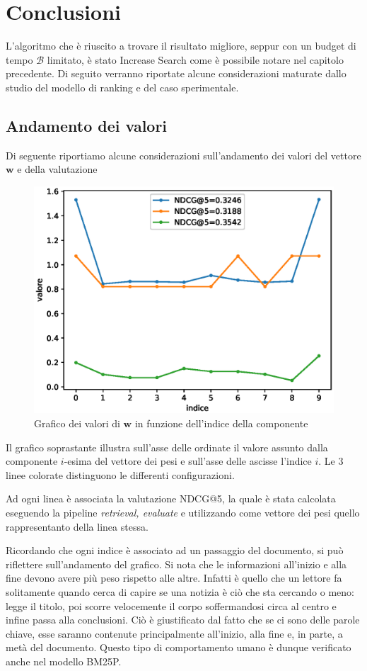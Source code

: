 \chapter{Conclusioni}
L'algoritmo che è riuscito a trovare il risultato migliore, seppur con un budget di tempo $\mathcal{B}$ limitato,
è stato Increase Search come è possibile notare nel capitolo precedente.
Di seguito verranno riportate alcune considerazioni maturate
dallo studio del modello di ranking e del caso sperimentale.

\section{Andamento dei valori}
Di seguente riportiamo alcune considerazioni sull'andamento dei valori
del vettore $\boldsymbol{w}$ e della valutazione


\begin{figure}[h!]
	\centering
	\includegraphics[width=0.7\linewidth]{figure/w_vectors}
	\caption[Distribuzione dei valori di $\boldsymbol{w}$]{Grafico dei valori di $\boldsymbol{w}$ in funzione dell'indice della componente}
	\label{fig:wvectors}
\end{figure}

Il grafico soprastante illustra sull'asse delle ordinate il valore assunto
dalla componente $i$-esima del vettore dei pesi e sull'asse delle ascisse
l'indice $i$. Le 3 linee colorate distinguono le differenti configurazioni.

Ad ogni linea è associata la valutazione NDCG@5, la quale è stata calcolata
eseguendo la pipeline \textit{retrieval, evaluate} e utilizzando come vettore
dei pesi quello rappresentanto della linea stessa.

Ricordando che ogni indice è associato ad un passaggio del documento,
si può riflettere sull'andamento del grafico.
Si nota che le informazioni all'inizio e alla fine
devono avere più peso rispetto alle altre. Infatti è quello che un lettore
fa solitamente quando cerca di capire se una notizia è ciò che sta cercando o meno:
legge il titolo, poi scorre velocemente il corpo soffermandosi circa al centro e
infine passa alla conclusioni. Ciò è giustificato
dal fatto che se ci sono delle parole chiave,
esse saranno contenute principalmente all'inizio, alla fine e, in parte, a metà del documento.
Questo tipo di comportamento umano è dunque
verificato anche nel modello BM25P.

